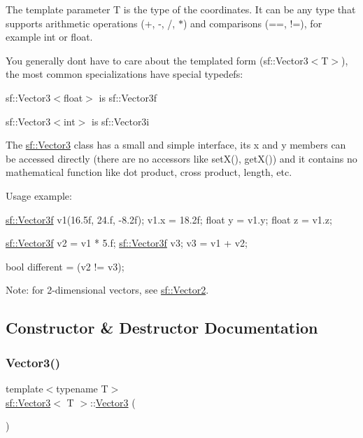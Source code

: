 The template parameter T is the type of the coordinates. It can be any type that supports arithmetic operations (+, -\/, /, $\ast$) and comparisons (==, !=), for example int or float.

You generally don\textquotesingle{}t have to care about the templated form (sf\+::\+Vector3$<$\+T$>$), the most common specializations have special typedefs\+: \begin{DoxyItemize}
\item sf\+::\+Vector3$<$float$>$ is sf\+::\+Vector3f \item sf\+::\+Vector3$<$int$>$ is sf\+::\+Vector3i\end{DoxyItemize}
The \hyperlink{classsf_1_1_vector3}{sf\+::\+Vector3} class has a small and simple interface, its x and y members can be accessed directly (there are no accessors like set\+X(), get\+X()) and it contains no mathematical function like dot product, cross product, length, etc.

Usage example\+: 
\begin{DoxyCode}
\hyperlink{classsf_1_1_vector3}{sf::Vector3f} v1(16.5f, 24.f, -8.2f);
v1.x = 18.2f;
\textcolor{keywordtype}{float} y = v1.y;
\textcolor{keywordtype}{float} z = v1.z;

\hyperlink{classsf_1_1_vector3}{sf::Vector3f} v2 = v1 * 5.f;
\hyperlink{classsf_1_1_vector3}{sf::Vector3f} v3;
v3 = v1 + v2;

\textcolor{keywordtype}{bool} different = (v2 != v3);
\end{DoxyCode}


Note\+: for 2-\/dimensional vectors, see \hyperlink{classsf_1_1_vector2}{sf\+::\+Vector2}. 

\subsection{Constructor \& Destructor Documentation}
\mbox{\label{classsf_1_1_vector3_aee8be1985c6e45e381ad4071265636f9}} 
\subsubsection{\texorpdfstring{Vector3()}{Vector3()}\hspace{0.1cm}{\footnotesize\ttfamily [1/3]}}
{\footnotesize\ttfamily template$<$typename T$>$ \\
\hyperlink{classsf_1_1_vector3}{sf\+::\+Vector3}$<$ T $>$\+::\hyperlink{classsf_1_1_vector3}{Vector3} (\begin{DoxyParamCaption}{ }\end{DoxyParamCaption})}



